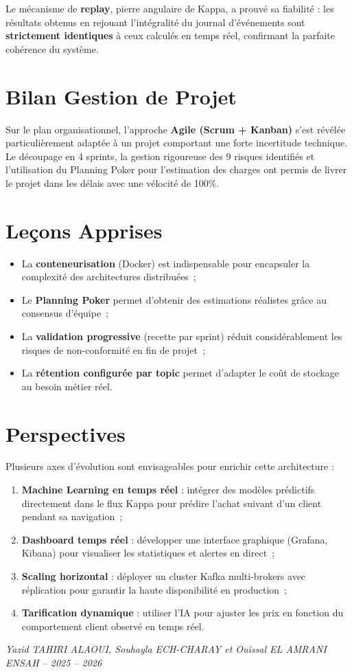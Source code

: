 \documentclass[a4paper,12pt]{report}
\newcommand{\docAuthor}{Yazid TAHIRI ALAOUI, Souhayla ECH-CHARAY et Ouissal EL AMRANI}
\newcommand{\docYear}{2025 -- 2026}
\begin{document}
Le mécanisme de \textbf{replay}, pierre angulaire de Kappa, a prouvé sa fiabilité : les résultats obtenus en rejouant l'intégralité du journal d'événements sont \textbf{strictement identiques} à ceux calculés en temps réel, confirmant la parfaite cohérence du système.

\section*{Bilan Gestion de Projet}

Sur le plan organisationnel, l'approche \textbf{Agile (Scrum + Kanban)} s'est révélée particulièrement adaptée à un projet comportant une forte incertitude technique. Le découpage en 4 sprints, la gestion rigoureuse des 9 risques identifiés et l'utilisation du Planning Poker pour l'estimation des charges ont permis de livrer le projet dans les délais avec une vélocité de 100\%.

\section*{Leçons Apprises}

\begin{itemize}
    \item La \textbf{conteneurisation} (Docker) est indispensable pour encapsuler la complexité des architectures distribuées~;
    \item Le \textbf{Planning Poker} permet d'obtenir des estimations réalistes grâce au consensus d'équipe~;
    \item La \textbf{validation progressive} (recette par sprint) réduit considérablement les risques de non-conformité en fin de projet~;
    \item La \textbf{rétention configurée par topic} permet d'adapter le coût de stockage au besoin métier réel.
\end{itemize}

\section*{Perspectives}

Plusieurs axes d'évolution sont envisageables pour enrichir cette architecture :

\begin{enumerate}
    \item \textbf{Machine Learning en temps réel} : intégrer des modèles prédictifs directement dans le flux Kappa pour prédire l'achat suivant d'un client pendant sa navigation~;
    \item \textbf{Dashboard temps réel} : développer une interface graphique (Grafana, Kibana) pour visualiser les statistiques et alertes en direct~;
    \item \textbf{Scaling horizontal} : déployer un cluster Kafka multi-brokers avec réplication pour garantir la haute disponibilité en production~;
    \item \textbf{Tarification dynamique} : utiliser l'IA pour ajuster les prix en fonction du comportement client observé en temps réel.
\end{enumerate}

\vspace{1.5cm}
\begin{flushright}
\textit{\docAuthor}\\
\textit{ENSAH -- \docYear}
\end{flushright}
\end{document}
